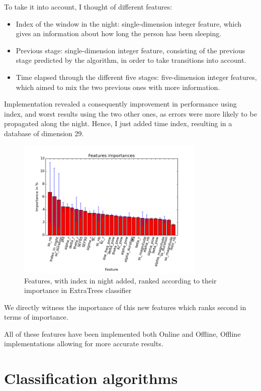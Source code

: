 \documentclass[12pt]{report}
\begin{document}
To take it into account, I thought of different features:
\begin{itemize}
\item Index of the window in the night: single-dimension integer feature, which gives an information about how long the person has been sleeping.
\item Previous stage: single-dimension integer feature, consisting of the previous stage predicted by the algorithm, in order to take transitions into account.
\item Time elapsed through the different five stages: five-dimension integer features, which aimed to mix the two previous ones with more information.
\end{itemize}

Implementation revealed a consequently improvement in performance using index, and worst results using the two other ones, as errors were more likely to be propagated along the night. Hence, I just added time index, resulting in a database of dimension 29.

\begin{figure}[H]
\centering
\includegraphics[width=0.8\textwidth]{img/chap2/feat_imp.png}
\caption{\label{fig:feat_imp}Features, with index in night added, ranked according to their importance in ExtraTrees classifier}
\end{figure}

We directly witness the importance of this new features which ranks second in terms of importance.

All of these features have been implemented both Online and Offline, Offline implementations allowing for more accurate results.

\newpage
\section{Classification algorithms}
\end{document}
